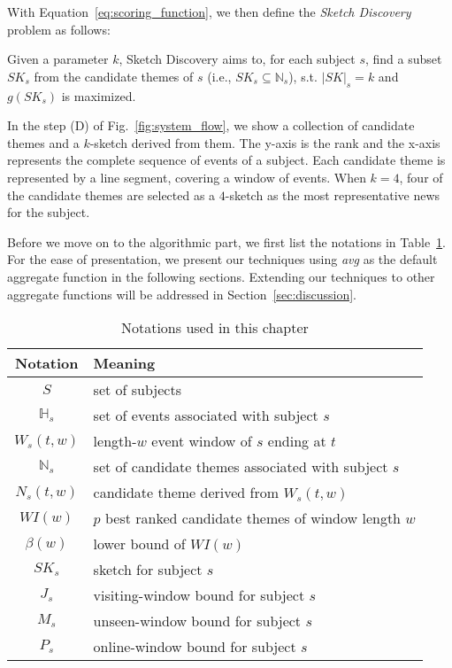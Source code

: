 With Equation~\ref{eq:scoring_function}, we then define the \emph{Sketch Discovery} problem as follows:

\begin{definition} 
Given a parameter $k$, Sketch Discovery aims to, for each subject $s$, 
find a subset $SK_s$ from the candidate themes of $s$ (i.e., $SK_s \subseteq \mathbb{N}_s$), s.t. $|SK|_s = k$ and $g(SK_s)$ is maximized.
\end{definition}

\begin{example}  
In the step (D) of Fig.~\ref{fig:system_flow}, we show a collection of candidate themes and a $k$-sketch derived from them. The y-axis is the rank and the x-axis represents the complete sequence of events of a subject. Each candidate theme is represented by a line segment, covering a window of events. When $k=4$, four of the candidate themes are selected as a $4$-sketch as the most representative news for the subject.	
\end{example}

Before we move on to the algorithmic part, we first list the notations in Table~\ref{tbl:notations}. For the 
ease of presentation, we present our techniques using \emph{avg} as the default aggregate function in the following sections. Extending our techniques to other aggregate functions will be addressed in Section~\ref{sec:discussion}.

\begin{table}[h]
\centering
\begin{tabular}{|c|l|}
\hline 
\textbf{Notation} & \textbf{Meaning} \\ 
\hline
$S$ & set of subjects \\
\hline
$\mathbb{H}_s$ & set of events associated with subject $s$\\
\hline
$W_s(t,w)$ & length-$w$ event window of $s$ ending at $t$\\
\hline
$\mathbb{N}_s$ & set of candidate themes associated with subject $s$\\
\hline 
$N_s(t, w)$ & candidate theme derived from $W_s(t,w)$ \\ 
\hline 
$WI(w)$ & $p$ best ranked candidate themes of window length $w$\\
\hline
$\beta(w)$ & lower bound of $WI(w)$\\
\hline
$SK_s$ & sketch for subject $s$ \\
\hline
$J_s$ & visiting-window bound for subject $s$ \\
\hline
$M_s$ & unseen-window bound for subject $s$\\
\hline
$P_s$ & online-window bound for subject $s$\\
\hline
\end{tabular} 
\caption{Notations used in this chapter}
\label{tbl:notations}
\end{table}
